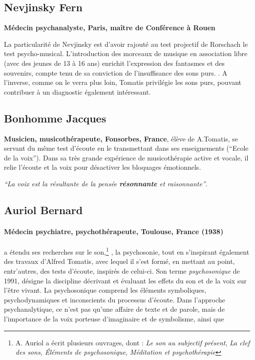 \subsection{ Nevjinsky Fern}
\textbf{Médecin psychanalyste, 
  Paris, maître de Conférence à Rouen}

 La particularité de Nevjinsky est d'avoir rajouté au test projectif de Rorschach le test psycho-musical.
L'introduction des morceaux de musique en association libre (avec
 des jeunes de 13 à 16 ans) enrichit l'expression des fantasmes et des
 souvenirs, compte tenu de sa conviction de l'insuffisance des sons purs. 
 \autocite{nevjinsky:adolescence}.
A l'inverse, comme on le verra plus loin, Tomatis
privilégie les sons purs,  pouvant contribuer à un diagnostic également intéressant.

 

  \subsection{ Bonhomme Jacques } 
  \textbf{Musicien, musicothérapeute,
    Fonsorbes, France}, élève de A.Tomatis, se servant du même test
  d'écoute en le transmettant dans ses enseignements (``Ecole de la
  voix''). Dans sa très grande expérience de musicothérapie active et
  vocale, il relie l'écoute et la voix pour désactiver les bloquages
  émotionnels.

  \textit{``La voix est la
      résultante de la pensée \textbf{résonnante}  et raisonnante''}. \autocite{bonhomme-key}
      \subsection{Auriol Bernard}
 
\paragraph{Médecin psychiatre,
   psychothérapeute, Toulouse, France (1938)}
a étendu ses recherches sur le son,\footnote{ A. Auriol a écrit plusieurs ouvrages, dont : \textsl{Le son au subjectif présent}, \textsl{La clef des sons, Éléments de psychosonique}, \textsl{Méditation et
  psychothérapie}} \autocite{auriol_stress}, la psychosonie, 
tout en s'inspirant également des
travaux d'Alfred Tomatis, avec lequel il s'est formé, en mettant au
point, entr'autres, des tests
d'écoute, inspirés de celui-ci. 
Son terme \emph{psychosonique} de 1991,
désigne la discipline décrivant et évaluant les effets du
son et de la voix sur l'être vivant.
La psychosonique comprend les éléments
symboliques, psychodynamiques et inconscients du processus
d'écoute.
Dans l'approche  psychanalytique, ce n'est pas qu'une affaire de
texte et de parole, mais de l'importance de la voix porteuse
d'imaginaire et de symbolisme, ainsi que

